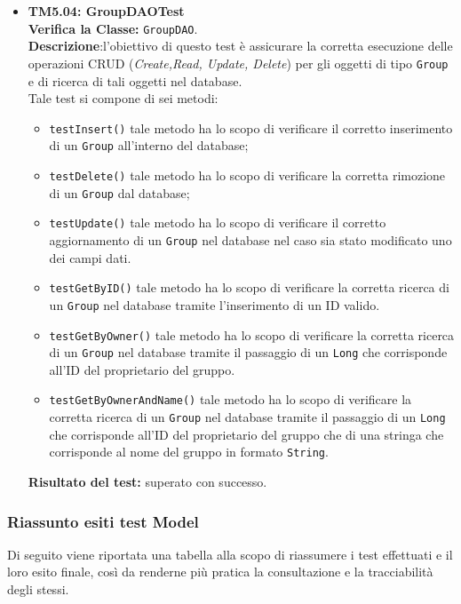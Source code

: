 \begin{itemize}
\item \textbf{TM5.04: GroupDAOTest}\\
\textbf{Verifica la Classe:} \texttt{GroupDAO}.\\
\textbf{Descrizione}:l'obiettivo di questo test è assicurare la corretta esecuzione delle operazioni CRUD (\textit{Create,Read, Update, Delete}) per gli oggetti di tipo \texttt{Group} e di ricerca di tali oggetti nel database. \\
Tale test si compone di sei metodi:
\begin{itemize}
\item \texttt{testInsert()} tale metodo ha lo scopo di verificare il corretto inserimento di un \texttt{Group} all'interno del database;
\item \texttt{testDelete()} tale metodo ha lo scopo di verificare la corretta rimozione di un \texttt{Group} dal database;
\item \texttt{testUpdate()} tale metodo ha lo scopo di verificare il corretto aggiornamento di un \texttt{Group} nel database nel caso sia stato modificato uno dei campi dati.
\item \texttt{testGetByID()} tale metodo ha lo scopo di verificare la corretta ricerca di un \texttt{Group} nel database tramite l'inserimento di un ID valido.
\item \texttt{testGetByOwner()} tale metodo ha lo scopo di verificare la corretta ricerca di un \texttt{Group} nel database tramite il passaggio di un \texttt{Long} che corrisponde all'ID del proprietario del gruppo.
\item \texttt{testGetByOwnerAndName()} tale metodo ha lo scopo di verificare la corretta ricerca di un \texttt{Group} nel database tramite il passaggio di un \texttt{Long} che corrisponde all'ID del proprietario del gruppo che di una stringa che corrisponde al nome del gruppo in formato \texttt{String}.
\end{itemize}
\textbf{Risultato del test:} superato con successo.

\end{itemize}

\subsubsection{Riassunto esiti test Model}
Di seguito viene riportata una tabella alla scopo di riassumere i test effettuati e il loro esito finale, così da renderne più pratica la consultazione e la tracciabilità degli stessi.

